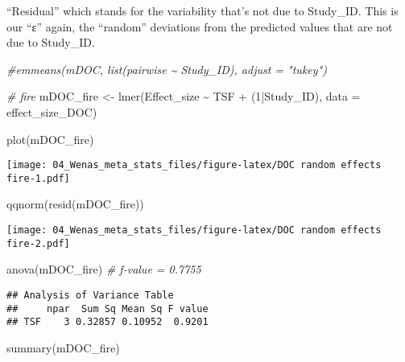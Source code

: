 \documentclass[
]{article}
\newenvironment{Shaded}{\begin{snugshade}}{\end{snugshade}}
\newcommand{\AttributeTok}[1]{\textcolor[rgb]{0.77,0.63,0.00}{#1}}
\newcommand{\CommentTok}[1]{\textcolor[rgb]{0.56,0.35,0.01}{\textit{#1}}}
\newcommand{\DecValTok}[1]{\textcolor[rgb]{0.00,0.00,0.81}{#1}}
\newcommand{\FunctionTok}[1]{\textcolor[rgb]{0.00,0.00,0.00}{#1}}
\newcommand{\NormalTok}[1]{#1}
\newcommand{\OtherTok}[1]{\textcolor[rgb]{0.56,0.35,0.01}{#1}}
\newcommand{\SpecialCharTok}[1]{\textcolor[rgb]{0.00,0.00,0.00}{#1}}
\begin{document}
``Residual'' which stands for the variability that's not due to
Study\_ID. This is our ``ε'' again, the ``random'' deviations from the
predicted values that are not due to Study\_ID.

\begin{Shaded}
\begin{Highlighting}[]
\CommentTok{\#emmeans(mDOC, list(pairwise \textasciitilde{} Study\_ID), adjust = "tukey")}

\CommentTok{\# fire}
\NormalTok{mDOC\_fire }\OtherTok{\textless{}{-}} \FunctionTok{lmer}\NormalTok{(Effect\_size }\SpecialCharTok{\textasciitilde{}}\NormalTok{ TSF }\SpecialCharTok{+}\NormalTok{ (}\DecValTok{1}\SpecialCharTok{|}\NormalTok{Study\_ID), }\AttributeTok{data =}\NormalTok{ effect\_size\_DOC)}

\FunctionTok{plot}\NormalTok{(mDOC\_fire)}
\end{Highlighting}
\end{Shaded}

\texttt{[image: 04\_Wenas\_meta\_stats\_files/figure-latex/DOC random effects fire-1.pdf]}

\begin{Shaded}
\begin{Highlighting}[]
\FunctionTok{qqnorm}\NormalTok{(}\FunctionTok{resid}\NormalTok{(mDOC\_fire))}
\end{Highlighting}
\end{Shaded}

\texttt{[image: 04\_Wenas\_meta\_stats\_files/figure-latex/DOC random effects fire-2.pdf]}

\begin{Shaded}
\begin{Highlighting}[]
\FunctionTok{anova}\NormalTok{(mDOC\_fire) }\CommentTok{\# f{-}value = 0.7755}
\end{Highlighting}
\end{Shaded}

\begin{verbatim}
## Analysis of Variance Table
##     npar  Sum Sq Mean Sq F value
## TSF    3 0.32857 0.10952  0.9201
\end{verbatim}

\begin{Shaded}
\begin{Highlighting}[]
\FunctionTok{summary}\NormalTok{(mDOC\_fire) }
\end{Highlighting}
\end{Shaded}
\end{document}
